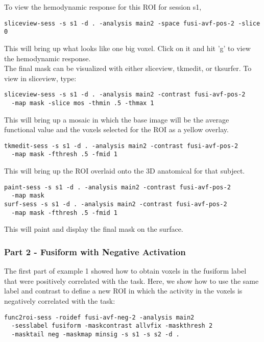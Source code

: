 \documentclass[10pt]{article}
\begin{document}
 To view the hemodynamic
response for this ROI for session s1,
\begin{verbatim}
sliceview-sess -s s1 -d . -analysis main2 -space fusi-avf-pos-2 -slice 0
\end{verbatim}
This will bring up what looks like one big voxel. Click on it and hit
'g' to view the hemodynamic response.\\

  The final mask can be visualized
with either sliceview, tkmedit, or tksurfer. To view in sliceview,
type:

\begin{verbatim}
sliceview-sess -s s1 -d . -analysis main2 -contrast fusi-avf-pos-2 
  -map mask -slice mos -thmin .5 -thmax 1
\end{verbatim}
This will bring up a mosaic in which the base image will be the
average functional value and the voxels selected for the ROI as a
yellow overlay.

\begin{verbatim}
tkmedit-sess -s s1 -d . -analysis main2 -contrast fusi-avf-pos-2 
  -map mask -fthresh .5 -fmid 1
\end{verbatim}
This will bring up the ROI overlaid onto the 3D anatomical for that
subject. 

\begin{verbatim}
paint-sess -s s1 -d . -analysis main2 -contrast fusi-avf-pos-2 
  -map mask 
surf-sess -s s1 -d . -analysis main2 -contrast fusi-avf-pos-2 
  -map mask -fthresh .5 -fmid 1
\end{verbatim}
This will paint and display the final mask on the surface.

\subsubsection{Part 2 - Fusiform with Negative Activation}

The first part of example 1 showed how to obtain voxels in the
fusiform label that were positively correlated with the task. Here, we
show how to use the same label and contrast to define a new ROI in
which the activity in the voxels is negatively correlated with the
task: 

\begin{verbatim}
func2roi-sess -roidef fusi-avf-neg-2 -analysis main2
  -sesslabel fusiform -maskcontrast allvfix -maskthresh 2
  -masktail neg -maskmap minsig -s s1 -s s2 -d . 
\end{verbatim}
\end{document}
